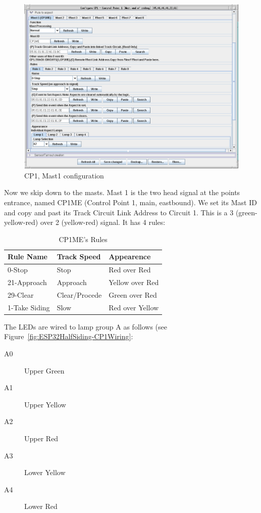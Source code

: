 \begin{figure}[hbpt]\begin{centering}%
\includegraphics[width=5in]{CP1-Mast1-Config.png}
\caption{CP1, Mast1 configuration}
\label{fig:CP1-Mast1-Config}
\end{centering}\end{figure}
Now we skip down to the masts. Mast 1 is the two head signal at the points
entrance, named CP1ME (Control Point 1, main, eastbound). We set its Mast ID
and copy and past its Track Circuit Link Address to Circuit 1. This is a 3
(green-yellow-red) over 2 (yellow-red) signal. It has 4 rules:
\begin{table}[htdp]\begin{centering}\begin{tabular}{|l|l|l|}
\hline
Rule Name&Track Speed&Appearence\\
\hline
0-Stop&Stop&Red over Red\\
21-Approach&Approach&Yellow over Red\\
29-Clear&Clear/Procede&Green over Red\\
1-Take Siding&Slow&Red over Yellow\\
\hline
\end{tabular}
\caption{CP1ME's Rules}
\label{tab:CP1MERules}
\end{centering}\end{table}
The LEDs are wired to lamp group A as follows (see Figure~\ref{fig:ESP32HalfSiding-CP1Wiring}: 
\begin{description}
\item[A0] Upper Green
\item[A1] Upper Yellow
\item[A2] Upper Red
\item[A3] Lower Yellow
\item[A4] Lower Red
\end{description}
